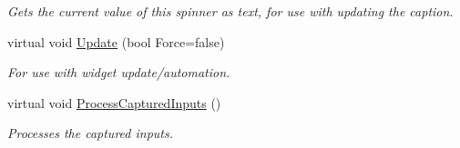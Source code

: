 \begin{DoxyCompactItemize}
\begin{DoxyCompactList}\small\item\em Gets the current value of this spinner as text, for use with updating the caption. \item\end{DoxyCompactList}\item 
\hypertarget{classphys_1_1UI_1_1Spinner_a9f19c47509ab45d47807d25b919f8af2}{
virtual void \hyperlink{classphys_1_1UI_1_1Spinner_a9f19c47509ab45d47807d25b919f8af2}{Update} (bool Force=false)}
\label{classphys_1_1UI_1_1Spinner_a9f19c47509ab45d47807d25b919f8af2}

\begin{DoxyCompactList}\small\item\em For use with widget update/automation. \item\end{DoxyCompactList}\item 
\hypertarget{classphys_1_1UI_1_1Spinner_acefea149af0d9e9afa06cd5f5559a546}{
virtual void \hyperlink{classphys_1_1UI_1_1Spinner_acefea149af0d9e9afa06cd5f5559a546}{ProcessCapturedInputs} ()}
\label{classphys_1_1UI_1_1Spinner_acefea149af0d9e9afa06cd5f5559a546}

\begin{DoxyCompactList}\small\item\em Processes the captured inputs. \item\end{DoxyCompactList}\end{DoxyCompactItemize}
